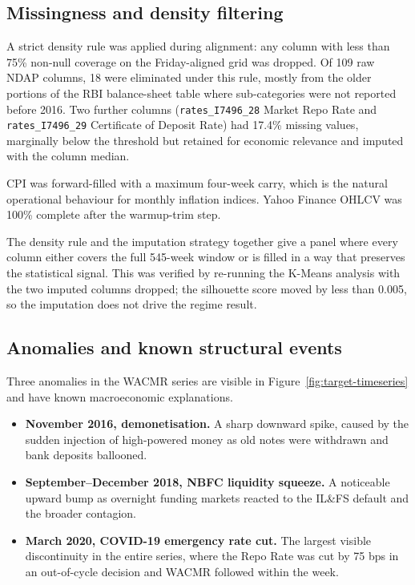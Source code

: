 \subsection{Missingness and density filtering}

A strict density rule was applied during alignment: any column with
less than 75\% non-null coverage on the Friday-aligned grid was
dropped. Of 109 raw NDAP columns, 18 were eliminated under this rule,
mostly from the older portions of the RBI balance-sheet table where
sub-categories were not reported before 2016. Two further columns
(\texttt{rates\_I7496\_28} Market Repo Rate and \texttt{rates\_I7496\_29}
Certificate of Deposit Rate) had 17.4\% missing values, marginally
below the threshold but retained for economic relevance and imputed
with the column median.

CPI was forward-filled with a maximum four-week carry, which is the
natural operational behaviour for monthly inflation indices. Yahoo
Finance OHLCV was 100\% complete after the warmup-trim step.

\begin{methodbox}
The density rule and the imputation strategy together give a panel
where every column either covers the full 545-week window or is
filled in a way that preserves the statistical signal. This was
verified by re-running the K-Means analysis with the two imputed
columns dropped; the silhouette score moved by less than 0.005, so
the imputation does not drive the regime result.
\end{methodbox}

\subsection{Anomalies and known structural events}

Three anomalies in the WACMR series are visible in
Figure~\ref{fig:target-timeseries} and have known macroeconomic
explanations.

\begin{itemize}
\item \textbf{November 2016, demonetisation.} A sharp downward spike,
  caused by the sudden injection of high-powered money as old notes
  were withdrawn and bank deposits ballooned.
\item \textbf{September--December 2018, NBFC liquidity squeeze.} A
  noticeable upward bump as overnight funding markets reacted to the
  IL\&FS default and the broader contagion.
\item \textbf{March 2020, COVID-19 emergency rate cut.} The
  largest visible discontinuity in the entire series, where the Repo
  Rate was cut by 75 bps in an out-of-cycle decision and WACMR
  followed within the week.
\end{itemize}


